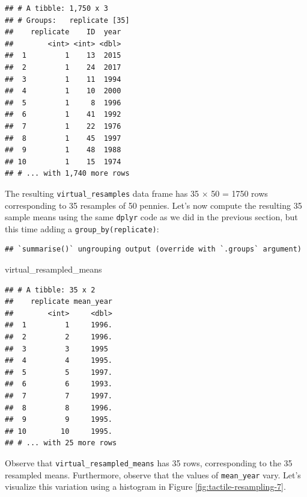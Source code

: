 \documentclass[
]{book}
\newenvironment{Shaded}{\begin{snugshade}}{\end{snugshade}}
\newcommand{\DataTypeTok}[1]{\textcolor[rgb]{0.13,0.29,0.53}{#1}}
\newcommand{\KeywordTok}[1]{\textcolor[rgb]{0.13,0.29,0.53}{\textbf{#1}}}
\newcommand{\NormalTok}[1]{#1}
\newcommand{\OperatorTok}[1]{\textcolor[rgb]{0.81,0.36,0.00}{\textbf{#1}}}
\newcommand{\StringTok}[1]{\textcolor[rgb]{0.31,0.60,0.02}{#1}}
\begin{document}
\begin{verbatim}
## # A tibble: 1,750 x 3
## # Groups:   replicate [35]
##    replicate    ID  year
##        <int> <int> <dbl>
##  1         1    13  2015
##  2         1    24  2017
##  3         1    11  1994
##  4         1    10  2000
##  5         1     8  1996
##  6         1    41  1992
##  7         1    22  1976
##  8         1    45  1997
##  9         1    48  1988
## 10         1    15  1974
## # ... with 1,740 more rows
\end{verbatim}

The resulting \texttt{virtual\_resamples} data frame has 35 \(\times\) 50 = 1750 rows corresponding to 35 resamples of 50 pennies. Let's now compute the resulting 35 sample means using the same \texttt{dplyr} code as we did in the previous section, but this time adding a \texttt{group\_by(replicate)}:

\begin{Shaded}
\end{Shaded}

\begin{verbatim}
## `summarise()` ungrouping output (override with `.groups` argument)
\end{verbatim}

\begin{Shaded}
\begin{Highlighting}[]
\NormalTok{virtual_resampled_means}
\end{Highlighting}
\end{Shaded}

\begin{verbatim}
## # A tibble: 35 x 2
##    replicate mean_year
##        <int>     <dbl>
##  1         1     1996.
##  2         2     1996.
##  3         3     1995 
##  4         4     1995.
##  5         5     1997.
##  6         6     1993.
##  7         7     1997.
##  8         8     1996.
##  9         9     1995.
## 10        10     1995.
## # ... with 25 more rows
\end{verbatim}

Observe that \texttt{virtual\_resampled\_means} has 35 rows, corresponding to the 35 resampled means. Furthermore, observe that the values of \texttt{mean\_year} vary. Let's visualize this variation using a histogram in Figure \ref{fig:tactile-resampling-7}.
\end{document}

